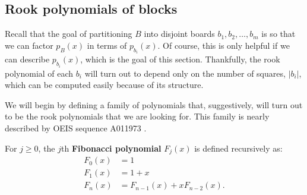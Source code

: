 

\subsection{Rook polynomials of blocks}
Recall that the goal of partitioning $B$ into disjoint boards $b_1, b_2, \dots, b_m$
is so that we can factor $p_B(x)$ in terms of $p_{b_i}(x)$. Of course, this is
only helpful if we can describe $p_{b_i}(x)$, which is the goal of this section.
Thankfully, the rook polynomial of each $b_i$ will turn out to depend only on the
number of squares, $|b_i|$, which can be computed easily because of its structure.

We will begin by defining a family of polynomials that, suggestively, will turn
out to be the rook polynomials that we are looking for. This family is nearly
described by OEIS sequence A011973 \cite{oeis}.
\begin{definition}
  For $j \geq 0$, the $j$th \textbf{Fibonacci polynomial} $F_{j}(x)$ is defined recursively as:
  \begin{align}
    F_0(x) &= 1 \\
    F_1(x) &= 1 + x \\
    F_n(x) &= F_{n-1}(x) + xF_{n-2}(x).
  \end{align}
\end{definition}

